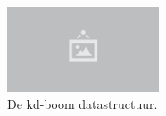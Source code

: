 \begin{figure}
  \centering
  \includegraphics[width=0.4\textwidth]{./img/raw/placeholder.png}
  \caption{De kd-boom datastructuur.}
  \label{fig:hs-datastructuur-kd}
\end{figure}
